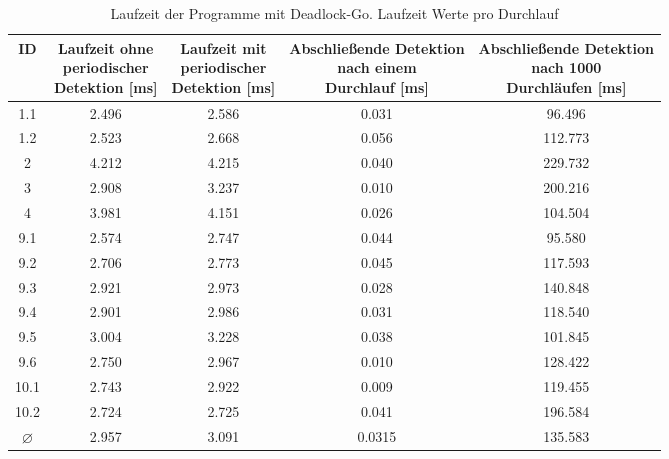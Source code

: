 \begin{table}[H]
    \centering
    \begin{tabular}{|c|c|c|c|c|}
    \hline
    ID &
      \makecell{Laufzeit ohne\\periodischer\\Detektion [ms]} &
      \makecell{Laufzeit mit\\periodischer\\Detektion [ms]} &
      \makecell{Abschließende Detektion\\nach einem\\Durchlauf [ms]} &
      \makecell{Abschließende Detektion\\nach 1000\\Durchläufen [ms]} \\ \hline
    1.1  & 2.496 & 2.586 & 0.031 & 96.496  \\ \hline
    1.2  & 2.523 & 2.668 & 0.056 & 112.773  \\ \hline
    2    & 4.212 & 4.215 & 0.040 & 229.732  \\ \hline
    3    & 2.908 & 3.237 & 0.010 & 200.216  \\ \hline
    4    & 3.981 & 4.151 & 0.026 & 104.504   \\ \hline
    9.1  & 2.574 & 2.747 & 0.044 & 95.580  \\ \hline
    9.2  & 2.706 & 2.773 & 0.045 & 117.593  \\ \hline
    9.3  & 2.921 & 2.973 & 0.028 & 140.848  \\ \hline
    9.4  & 2.901 & 2.986 & 0.031 & 118.540  \\ \hline
    9.5  & 3.004 & 3.228 & 0.038 & 101.845  \\ \hline
    9.6  & 2.750 & 2.967 & 0.010 & 128.422  \\ \hline
    10.1 & 2.743 & 2.922 & 0.009 & 119.455  \\ \hline
    10.2 & 2.724 & 2.725 & 0.041 & 196.584 \\ \hline
    $\varnothing$ & 2.957 & 3.091 & 0.0315 & 135.583 \\ \hline
    \end{tabular}
    \caption{Laufzeit der Programme mit Deadlock-Go. Laufzeit Werte pro Durchlauf}
    \label{Kap::Analysis:Deadlock-Go}
\end{table}

